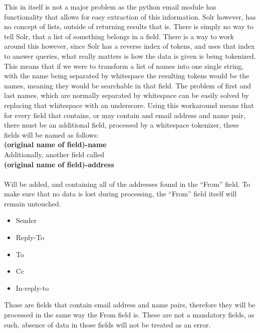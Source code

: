 \documentclass{report}
\begin{document}
This in itself is not a major problem as the python email module has functionality that allows for easy extraction of this information. Solr however, has no concept of lists, outside of returning results that is. There is simply no way to tell Solr, that a list of something belongs in a field. There is a way to work around this however, since Solr has a reverse index of tokens, and uses that index to answer queries, what really matters is how the data is given is being tokenized. This means that if we were to transform a list of names into one single string, with the name being separated by whitespace the resulting tokens would be the names, meaning they would be searchable in that field. The problem of first and last names, which are normally separated by whitespace can be easily solved by replacing that whitespace with an underscore. Using this workaround means that for every field that contains, or may contain and email address and name pair, there must be an additional field, processed by a whitespace tokenizer, these fields will be named as follows:\\

\textbf{(original name of field)-name}\\ 

Additionally, another field called\\ 

\textbf{(original name of field)-address} \\\\
\noindent
Will be added, and containing all of the addresses found in the “From” field.
To make sure that no data is lost during processing, the “From” field itself will remain untouched.

\begin{itemize}
\item Sender
\item Reply-To
\item To
\item Cc
\item In-reply-to
\end{itemize}
Those are  fields that contain email address and name pairs, therefore they will be processed in the same way the From field is. These are not a mandatory fields, as such, absence of data in those fields will not be treated as an error.\\
\end{document}
